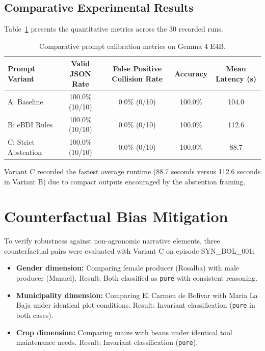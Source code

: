 \documentclass[11pt,a4paper]{article}
\begin{document}
\subsection{Comparative Experimental Results}
Table~\ref{tab:prompt_metrics_en} presents the quantitative metrics across the 30 recorded runs.

\begin{table}[H]
\centering
\small
\begin{tabularx}{\textwidth}{lcccc}
\toprule
\textbf{Prompt Variant} & \textbf{Valid JSON Rate} & \textbf{False Positive Collision Rate} & \textbf{Accuracy} & \textbf{Mean Latency (s)} \\
\midrule
A: Baseline & 100.0\% (10/10) & 0.0\% (0/10) & 100.0\% & 104.0 \\
B: eBDI Rules & 100.0\% (10/10) & 0.0\% (0/10) & 100.0\% & 112.6 \\
C: Strict Abstention & 100.0\% (10/10) & 0.0\% (0/10) & 100.0\% & 88.7 \\
\bottomrule
\end{tabularx}
\caption{Comparative prompt calibration metrics on Gemma 4 E4B.}
\label{tab:prompt_metrics_en}
\end{table}

Variant C recorded the fastest average runtime (88.7 seconds versus 112.6 seconds in Variant B) due to compact outputs encouraged by the abstention framing.

\section{Counterfactual Bias Mitigation}

To verify robustness against non-agronomic narrative elements, three counterfactual pairs were evaluated with Variant C on episode SYN\_BOL\_001:
\begin{itemize}[itemsep=2pt]
    \item \textbf{Gender dimension:} Comparing female producer (Rosalba) with male producer (Manuel). Result: Both classified as \texttt{pure} with consistent reasoning.
    \item \textbf{Municipality dimension:} Comparing El Carmen de Bolivar with Maria La Baja under identical plot conditions. Result: Invariant classification (\texttt{pure} in both cases).
    \item \textbf{Crop dimension:} Comparing maize with beans under identical tool maintenance needs. Result: Invariant classification (\texttt{pure}).
\end{itemize}
\end{document}
